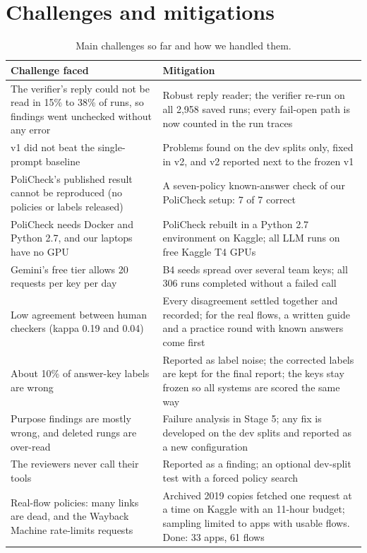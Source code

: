 \documentclass[11pt,a4paper]{article}
\newcommand{\rowline}{\specialrule{0.2pt}{3pt}{3pt}}
\begin{document}
\section{Challenges and mitigations}

\begin{table}[H]
\centering
\small
\begin{tabular}{L{7.2cm}L{7.6cm}}
\toprule
Challenge faced & Mitigation \\
\midrule
The verifier's reply could not be read in 15\% to 38\% of runs, so findings went unchecked
without any error & Robust reply reader; the verifier re-run on all 2,958 saved runs; every
fail-open path is now counted in the run traces \\ \rowline
v1 did not beat the single-prompt baseline & Problems found on the dev splits only, fixed in v2,
and v2 reported next to the frozen v1 \\ \rowline
PoliCheck's published result cannot be reproduced (no policies or labels released) & A
seven-policy known-answer check of our PoliCheck setup: 7 of 7 correct \\ \rowline
PoliCheck needs Docker and Python 2.7, and our laptops have no GPU & PoliCheck rebuilt in a
Python 2.7 environment on Kaggle; all LLM runs on free Kaggle T4 GPUs \\ \rowline
Gemini's free tier allows 20 requests per key per day & B4 seeds spread over several team keys;
all 306 runs completed without a failed call \\ \rowline
Low agreement between human checkers (kappa 0.19 and 0.04) & Every disagreement settled
together and recorded; for the real flows, a written guide and a practice round with known
answers come first \\ \rowline
About 10\% of answer-key labels are wrong & Reported as label noise; the corrected labels are
kept for the final report; the keys stay frozen so all systems are scored the same way \\ \rowline
Purpose findings are mostly wrong, and deleted rungs are over-read & Failure analysis in Stage 5;
any fix is developed on the dev splits and reported as a new configuration \\ \rowline
The reviewers never call their tools & Reported as a finding; an optional dev-split test with a
forced policy search \\ \rowline
Real-flow policies: many links are dead, and the Wayback Machine rate-limits requests & Archived
2019 copies fetched one request at a time on Kaggle with an 11-hour budget; sampling limited to
apps with usable flows. Done: 33 apps, 61 flows \\
\bottomrule
\end{tabular}
\caption{Main challenges so far and how we handled them.}
\end{table}
\end{document}
